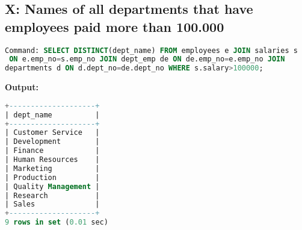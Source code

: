 \documentclass[12pt]{report}
\begin{document}
\subsection*{X: Names of all departments that have employees paid more
than 100.000}

\begin{lstlisting}[language=sql]
Command: SELECT DISTINCT(dept_name) FROM employees e JOIN salaries s
 ON e.emp_no=s.emp_no JOIN dept_emp de ON de.emp_no=e.emp_no JOIN 
departments d ON d.dept_no=de.dept_no WHERE s.salary>100000;
\end{lstlisting}
\textbf{Output:}
\begin{lstlisting}[language=sql]
+--------------------+
| dept_name          |
+--------------------+
| Customer Service   |
| Development        |
| Finance            |
| Human Resources    |
| Marketing          |
| Production         |
| Quality Management |
| Research           |
| Sales              |
+--------------------+
9 rows in set (0.01 sec)

\end{lstlisting}
\end{document}
